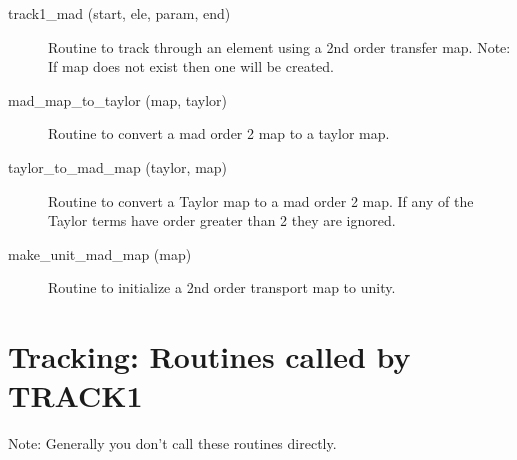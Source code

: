 \begin{description}
\label{r:track1.mad}
\item[track1_mad (start, ele, param, end)] \Newline 
     Routine to track through an element using a 2nd order transfer map.
     Note: If map does not exist then one will be created. 

\label{r:mad.map.to.taylor}
\item[mad_map_to_taylor (map, taylor)] \Newline 
     Routine to convert a mad order 2 map to a taylor map.

\label{r:taylor.to.mad.map}
\item[taylor_to_mad_map (taylor, map)] \Newline 
     Routine to convert a Taylor map to a mad order 2 map.
     If any of the Taylor terms have order greater than 2 they are ignored.

\label{r:make.unit.mad.map}
\item[make_unit_mad_map (map)] \Newline 
     Routine to initialize a 2nd order transport map to unity.


\end{description}

\section{Tracking: Routines called by TRACK1}
\label{r:track1.call}   

Note: Generally you don't call these routines directly.

